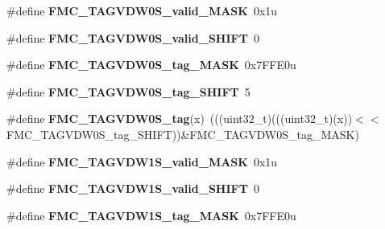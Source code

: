 \begin{DoxyCompactItemize}
\item 
\#define {\bfseries F\+M\+C\+\_\+\+T\+A\+G\+V\+D\+W0\+S\+\_\+valid\+\_\+\+M\+A\+SK}~0x1u\hypertarget{group__FMC__Register__Masks_ga53cc204af469276cc9972aff2749de4c}{}\label{group__FMC__Register__Masks_ga53cc204af469276cc9972aff2749de4c}

\item 
\#define {\bfseries F\+M\+C\+\_\+\+T\+A\+G\+V\+D\+W0\+S\+\_\+valid\+\_\+\+S\+H\+I\+FT}~0\hypertarget{group__FMC__Register__Masks_ga4146a7816c19b4a472f7f0b4eca88677}{}\label{group__FMC__Register__Masks_ga4146a7816c19b4a472f7f0b4eca88677}

\item 
\#define {\bfseries F\+M\+C\+\_\+\+T\+A\+G\+V\+D\+W0\+S\+\_\+tag\+\_\+\+M\+A\+SK}~0x7\+F\+F\+E0u\hypertarget{group__FMC__Register__Masks_ga142a31eebf09fdb7f94e62f371e6a5f5}{}\label{group__FMC__Register__Masks_ga142a31eebf09fdb7f94e62f371e6a5f5}

\item 
\#define {\bfseries F\+M\+C\+\_\+\+T\+A\+G\+V\+D\+W0\+S\+\_\+tag\+\_\+\+S\+H\+I\+FT}~5\hypertarget{group__FMC__Register__Masks_ga98f1e6497478f043fb34fa0657777807}{}\label{group__FMC__Register__Masks_ga98f1e6497478f043fb34fa0657777807}

\item 
\#define {\bfseries F\+M\+C\+\_\+\+T\+A\+G\+V\+D\+W0\+S\+\_\+tag}(x)~(((uint32\+\_\+t)(((uint32\+\_\+t)(x))$<$$<$F\+M\+C\+\_\+\+T\+A\+G\+V\+D\+W0\+S\+\_\+tag\+\_\+\+S\+H\+I\+FT))\&F\+M\+C\+\_\+\+T\+A\+G\+V\+D\+W0\+S\+\_\+tag\+\_\+\+M\+A\+SK)\hypertarget{group__FMC__Register__Masks_gaf6713d1ea74fc0a7aac58b6cfb2f16a1}{}\label{group__FMC__Register__Masks_gaf6713d1ea74fc0a7aac58b6cfb2f16a1}

\item 
\#define {\bfseries F\+M\+C\+\_\+\+T\+A\+G\+V\+D\+W1\+S\+\_\+valid\+\_\+\+M\+A\+SK}~0x1u\hypertarget{group__FMC__Register__Masks_gaed37a62e513bc50a18cccf4cd8ee671e}{}\label{group__FMC__Register__Masks_gaed37a62e513bc50a18cccf4cd8ee671e}

\item 
\#define {\bfseries F\+M\+C\+\_\+\+T\+A\+G\+V\+D\+W1\+S\+\_\+valid\+\_\+\+S\+H\+I\+FT}~0\hypertarget{group__FMC__Register__Masks_ga2399e43fc56c8c9765ee4b259064eca0}{}\label{group__FMC__Register__Masks_ga2399e43fc56c8c9765ee4b259064eca0}

\item 
\#define {\bfseries F\+M\+C\+\_\+\+T\+A\+G\+V\+D\+W1\+S\+\_\+tag\+\_\+\+M\+A\+SK}~0x7\+F\+F\+E0u\hypertarget{group__FMC__Register__Masks_ga45f190c0d7ee9c842a0e5f5bedd047d1}{}\label{group__FMC__Register__Masks_ga45f190c0d7ee9c842a0e5f5bedd047d1}


\end{DoxyCompactItemize}
